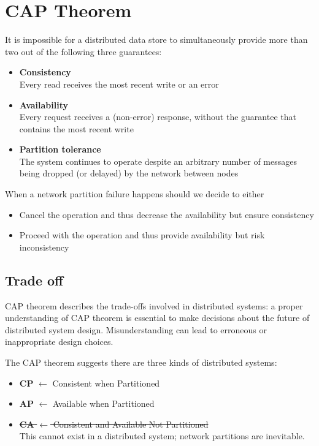 \chapter{CAP Theorem}
\begin{definition}
   It is impossible for a distributed data store to simultaneously provide more than two out of the following three guarantees:
   \begin{itemize}
   	\item \textbf{Consistency}\\
            Every read receives the most recent write or an error
   	\item \textbf{Availability}\\
            Every request receives a (non-error) response, without the guarantee that contains the most recent write
   	\item \textbf{Partition tolerance}\\
            The system continues to operate despite an arbitrary number of messages being dropped (or delayed) by the network between nodes
   \end{itemize}
\end{definition}


{When a network partition failure happens should we decide to either\ns
\begin{itemize}
	\item Cancel the operation and thus decrease the availability but ensure consistency
	\item Proceed with the operation and thus provide availability but risk inconsistency
\end{itemize}}

\section{Trade off}
CAP theorem describes the trade-offs involved in distributed systems: a proper understanding of CAP theorem is essential to make decisions about the future of distributed system design.
Misunderstanding can lead to erroneous or inappropriate design choices.

{The CAP theorem suggests there are three kinds of distributed
systems:\ns
\begin{itemize}
	\item \textbf{CP} $\leftarrow$ Consistent when Partitioned
	\item \textbf{AP} $\leftarrow$ Available when Partitioned
	\item \st{\textbf{CA} $\leftarrow$ Consistent and Available Not Partitioned}\\
	This cannot exist in a distributed system; network partitions are inevitable. 
\end{itemize}}

